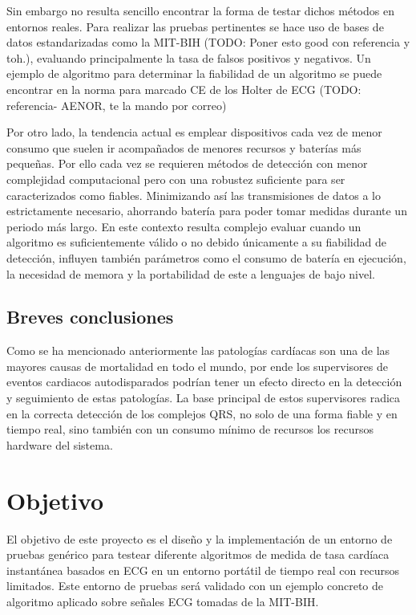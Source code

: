 Sin embargo no resulta sencillo encontrar la forma de testar dichos métodos en entornos reales. Para realizar las pruebas pertinentes se hace uso de bases de datos estandarizadas como la MIT-BIH (TODO: Poner esto good con referencia y toh.), evaluando principalmente la tasa de falsos positivos y negativos.\cite{Pooja} Un ejemplo de algoritmo para determinar la fiabilidad de un algoritmo se puede encontrar en la norma para marcado CE de los Holter de ECG (TODO: referencia- AENOR, te la mando por correo)

Por otro lado, la tendencia actual es emplear dispositivos cada vez de menor consumo que suelen ir acompañados de menores recursos y baterías más pequeñas. Por ello cada vez se requieren métodos de detección con menor complejidad computacional pero con una robustez suficiente para ser caracterizados como fiables. Minimizando así las transmisiones de datos a lo estrictamente necesario, ahorrando batería para poder tomar medidas durante un periodo más largo. En este contexto resulta complejo evaluar cuando un algoritmo es suficientemente válido o no debido únicamente a su fiabilidad de detección, influyen también parámetros como el consumo de batería en ejecución, la necesidad de memora y la portabilidad de este a lenguajes de bajo nivel.

\subsection{Breves conclusiones}

Como se ha mencionado anteriormente las patologías cardíacas son una de las mayores causas de mortalidad en todo el mundo, por ende los supervisores de eventos cardiacos autodisparados podrían tener un efecto directo en la detección y seguimiento de estas patologías. La base principal de estos supervisores radica en la correcta detección de los complejos QRS, no solo de una forma fiable y en tiempo real, sino también con un consumo mínimo de recursos los recursos hardware del sistema.

\section{Objetivo}
El objetivo de este proyecto es el diseño y la implementación de un entorno de pruebas genérico para testear diferente algoritmos de medida de tasa cardíaca instantánea basados en ECG en un entorno portátil de tiempo real con recursos limitados. Este entorno de pruebas será validado con un ejemplo concreto de algoritmo aplicado sobre señales ECG tomadas de la MIT-BIH.


